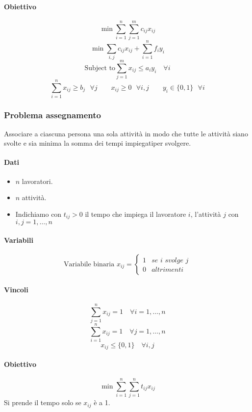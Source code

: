 \documentclass[12pt, letterpaper]{article}
\newcommand{\problema}[5]{
	#1
	\begin{dati}
		\paragraph{Dati} #2
	\end{dati}
	\begin{variabili}
		\paragraph{Variabili} #3
	\end{variabili}
	\begin{vincoli}
		\paragraph{Vincoli} #4
	\end{vincoli}
	\begin{obiettivo}
		\paragraph{Obiettivo} #5
	\end{obiettivo}
}
\begin{document}
				\begin{obiettivo}
					\paragraph{Obiettivo}
						$$\min \sum_{i=1}^n \sum_{j=1}^m c_{ij} x_{ij}$$
						$$\min \sum_{i,j} c_{ij}x_{ij} + \sum_{i=1}^n f_i y_i$$
						$$\text{Subject to} \sum_{j=1}^m x_{ij} \leq a_i y_i \quad \forall i$$
						$$\sum_{i=1}^n x_{ij} \geq b_j \text{ } \forall j \qquad x_{ij} \geq 0 \text{ } \forall i,j \qquad
						 y_i \in \{0,1\} \text{ } \forall i $$	
				\end{obiettivo}	
				
		\subsubsection{Problema assegnamento}					
			\problema
				{ Associare a ciascuna persona una sola attività in modo che tutte le attività siano svolte e sia minima la somma dei tempi impiegatiper svolgere.
				}
				{\begin{itemize}
					\item $n$ lavoratori.
					\item $n$ attività.
					\item Indichiamo con $t_{ij} > 0$ il tempo che impiega il lavoratore $i$, l'attività $j$ con $i,j= 1, \dots, n$
				\end{itemize}
				}
				{$$\text{Variabile binaria } x_{ij}= 
				\begin {cases}
					1 & \textit{se i svolge j}\\
					0 & altrimenti
					
				\end{cases}
				$$}
				{
				$$\sum_{j=1}^n x_{ij} = 1 \quad \forall i = 1, \dots, n$$
				$$\sum_{i=1}^n x_{ij} = 1 \quad \forall j = 1, \dots, n$$
				$$x_{ij} \leq \{0,1\} \quad \forall i,j$$
				}
				{$$\min \sum_{i=1}^n \sum_{j=1}^n t_{ij}x_{ij}$$
				Si prende il tempo solo se $x_{ij}$ è a 1.}
			
\end{document}
